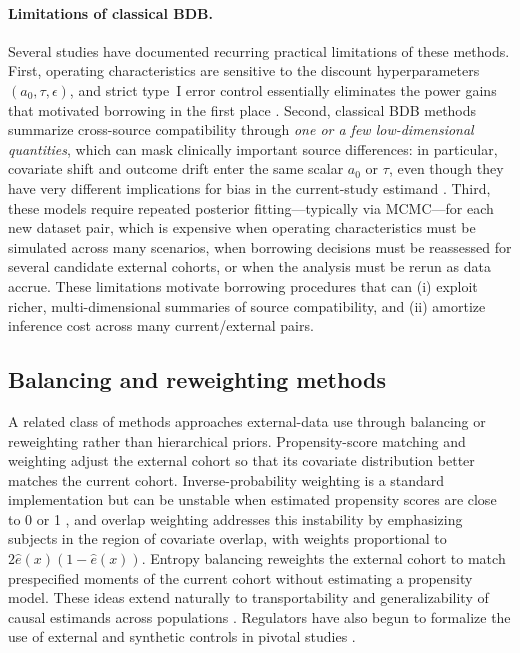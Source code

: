 \paragraph{Limitations of classical BDB.}
Several studies have documented recurring practical limitations of these
methods.
First, operating characteristics are sensitive to the discount
hyperparameters $(a_0,\tau,\epsilon)$, and strict type~I error control
essentially eliminates the power gains that motivated borrowing in the first
place \citep{koppschneider2020power,galwey2017supplementation,
vanrosmalen2018including}.
Second, classical BDB methods summarize cross-source compatibility through
\emph{one or a few low-dimensional quantities}, which can mask clinically
important source differences: in particular, covariate shift and outcome
drift enter the same scalar $a_0$ or $\tau$, even though they have very
different implications for bias in the current-study estimand
\citep{viele2014use,dahabreh2019generalizing}.
Third, these models require repeated posterior fitting---typically via
MCMC---for each new dataset pair, which is expensive when operating
characteristics must be simulated across many scenarios, when borrowing
decisions must be reassessed for several candidate external cohorts, or when
the analysis must be rerun as data accrue.
These limitations motivate borrowing procedures that can (i) exploit richer,
multi-dimensional summaries of source compatibility, and (ii) amortize
inference cost across many current/external pairs.

\subsection{Balancing and reweighting methods}

A related class of methods approaches external-data use through balancing or
reweighting rather than hierarchical priors.
Propensity-score matching and weighting
\citep{rosenbaum1983central,stuart2010matching} adjust the external cohort so
that its covariate distribution better matches the current cohort.
Inverse-probability weighting is a standard implementation but can be
unstable when estimated propensity scores are close to 0 or 1
\citep{chesnaye2022introduction}, and overlap weighting
\citep{li2018balancing,li2019addressing} addresses this instability by
emphasizing subjects in the region of covariate overlap, with weights
proportional to $2\hat e(x)(1-\hat e(x))$.
Entropy balancing \citep{hainmueller2012entropy} reweights the external
cohort to match prespecified moments of the current cohort without estimating
a propensity model.
These ideas extend naturally to transportability and generalizability of
causal estimands across populations
\citep{dahabreh2019generalizing}.
Regulators have also begun to formalize the use of external and synthetic
controls in pivotal studies \citep{thorlund2020synthetic,fda2023external}.

